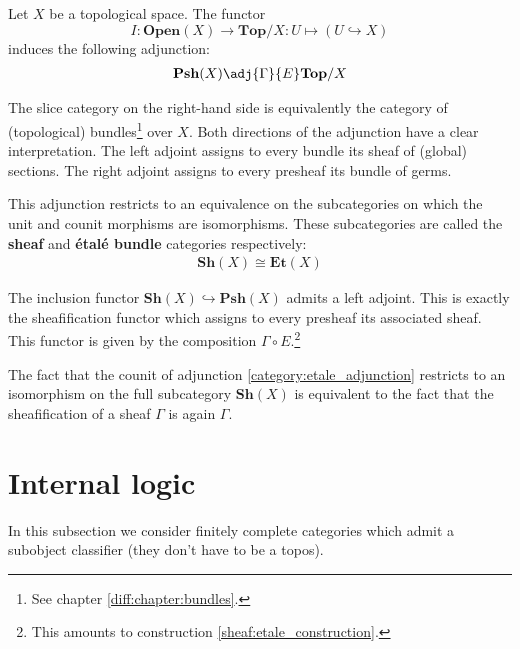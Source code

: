 	\begin{construct}
		Let $X$ be a topological space. The functor \[I:\textbf{Open}(X)\rightarrow\textbf{Top}/X:U\mapsto(U\hookrightarrow X)\] induces the following adjunction:
		\begin{gather}
			\label{category:etale_adjunction}
			\textbf{Psh}(X) \adj{\Gamma}{E} \textbf{Top}/X
		\end{gather}
		
		The slice category on the right-hand side is equivalently the category of (topological) bundles\footnote{See chapter \ref{diff:chapter:bundles}.} over $X$. Both directions of the adjunction have a clear interpretation. The left adjoint assigns to every bundle its sheaf of (global) sections. The right adjoint assigns to every presheaf its bundle of germs.
		
		This adjunction restricts to an equivalence on the subcategories on which the unit and counit morphisms are isomorphisms. These subcategories are called the \textbf{sheaf} and \textbf{\'etal\'e bundle} categories respectively:
		\begin{gather}
			\textbf{Sh}(X) \cong \textbf{Et}(X)
		\end{gather}
	\end{construct}
	
	\begin{property}
		The inclusion functor $\textbf{Sh}(X)\hookrightarrow\textbf{Psh}(X)$ admits a left adjoint. This is exactly the sheafification functor which assigns to every presheaf its associated sheaf. This functor is given by the composition $\Gamma\circ E$.\footnote{This amounts to construction \ref{sheaf:etale_construction}.}
		
		The fact that the counit of adjunction \ref{category:etale_adjunction} restricts to an isomorphism on the full subcategory $\textbf{Sh}(X)$ is equivalent to the fact that the sheafification of a sheaf $\Gamma$ is again $\Gamma$.
	\end{property}

	
\section{Internal logic}\label{cat:internal_logic}

	In this subsection we consider finitely complete categories which admit a subobject classifier (they don't have to be a topos).
	
	
